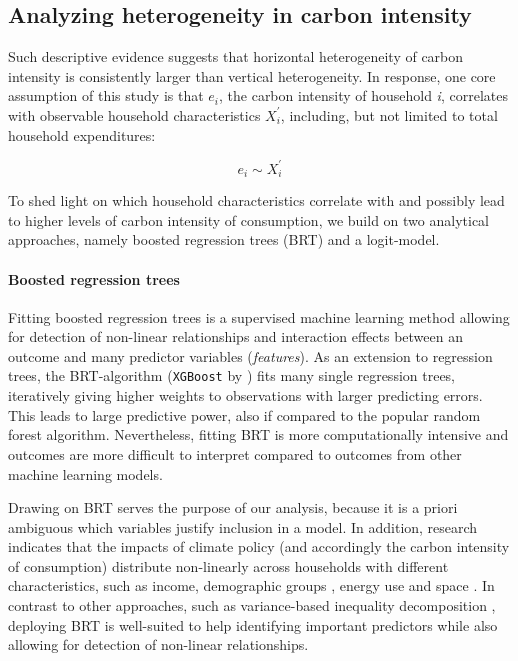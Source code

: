 \documentclass[12pt, a4paper]{article}
\begin{document}
\subsection{Analyzing heterogeneity in carbon intensity} \label{sec:methods}

Such descriptive evidence suggests that horizontal heterogeneity of carbon intensity is consistently larger than vertical heterogeneity. In response, one core assumption of this study is that $e_{i}$, the carbon intensity of household \textit{i}, correlates with observable household characteristics $X_{i}^{'}$, including, but not limited to total household expenditures:

\begin{equation} \label{eq:relationship}
    e_{i} \sim X_{i}^{'}
\end{equation}


To shed light on which household characteristics correlate with and possibly lead to higher levels of carbon intensity of consumption, we build on two analytical approaches, namely boosted regression trees (BRT) and a logit-model.

\paragraph{Boosted regression trees} Fitting boosted regression trees \autocite{Friedman.2003, Elith.2008} is a supervised machine learning method allowing for detection of non-linear relationships and interaction effects between an outcome and many predictor variables (\textit{features}). As an extension to regression trees, the BRT-algorithm (\texttt{XGBoost} by \textcite{Chen.2016}) fits many single regression trees, iteratively giving higher weights to observations with larger predicting errors. This leads to large predictive power, also if compared to the popular random forest algorithm. Nevertheless, fitting BRT is more computationally intensive and outcomes are more difficult to interpret compared to outcomes from other machine learning models. 

Drawing on BRT serves the purpose of our analysis, because it is a priori ambiguous which variables justify inclusion in a model. In addition, research indicates that the impacts of climate policy (and accordingly the carbon intensity of consumption) distribute non-linearly across households with different characteristics, such as income, demographic groups \autocite{Missbach.2023}, energy use \autocite{Farrell.2017} and space \autocite{Chan.2023}. In contrast to other approaches, such as variance-based inequality decomposition \autocite{Farrell.2017,Sager.2019,Missbach.2024}, deploying BRT is well-suited to help identifying important predictors while also allowing for detection of non-linear relationships.
\end{document}
